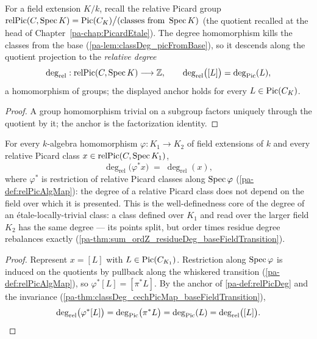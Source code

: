 \begin{definition}
  \label{pa-def:relPicDeg}
  \leanok

  For a field extension \(K/k\), recall the relative Picard group
  \(\mathrm{relPic}(C, \operatorname{Spec} K) = \operatorname{Pic}(C_K) \big/ (\text{classes from } \operatorname{Spec} K)\)
  (the quotient recalled at the head of Chapter~\ref{pa-chap:PicardEtale}). The degree
  homomorphism kills the classes from the base
  (\ref{pa-lem:classDeg_picFromBase}), so it descends along the quotient projection to
  the \emph{relative degree}
  \[
    \deg_{\mathrm{rel}} : \mathrm{relPic}(C, \operatorname{Spec} K) \longrightarrow \mathbb{Z},
    \qquad \deg_{\mathrm{rel}}\bigl([L]\bigr) = \deg_{\operatorname{Pic}}(L),
  \]
  a homomorphism of groups; the displayed anchor holds for every
  \(L \in \operatorname{Pic}(C_K)\).
\end{definition}
\begin{proof}
  \leanok
  A group homomorphism trivial on a subgroup factors uniquely through the quotient by
  it; the anchor is the factorization identity.
\end{proof}

\begin{theorem}
  \label{pa-thm:relPicDeg_relPicAlgMap}
  \leanok

  For every \(k\)-algebra homomorphism \(\varphi : K_1 \to K_2\) of field extensions
  of \(k\) and every relative Picard class \(x \in \mathrm{relPic}(C, \operatorname{Spec} K_1)\),
  \[
    \deg_{\mathrm{rel}}\bigl(\varphi^{*}x\bigr) \;=\; \deg_{\mathrm{rel}}(x),
  \]
  where \(\varphi^{*}\) is restriction of relative Picard classes along
  \(\operatorname{Spec}\varphi\) (\ref{pa-def:relPicAlgMap}): the degree of a relative Picard class
  does not depend on the field over which it is presented. This is the
  well-definedness core of the degree of an \'etale-locally-trivial class: a class
  defined over \(K_1\) and read over the larger field \(K_2\) has the same degree ---
  its points split, but order times residue degree rebalances exactly
  (\ref{pa-thm:sum_ordZ_residueDeg_baseFieldTransition}).
\end{theorem}
\begin{proof}
  \leanok
  Represent \(x = [L]\) with \(L \in \operatorname{Pic}(C_{K_1})\). Restriction along
  \(\operatorname{Spec}\varphi\) is induced on the quotients by pullback along the whiskered
  transition (\ref{pa-def:relPicAlgMap}), so \(\varphi^{*}[L] = [\pi^{*}L]\). By the
  anchor of \ref{pa-def:relPicDeg} and the invariance
  (\ref{pa-thm:classDeg_cechPicMap_baseFieldTransition}),
  \[
    \deg_{\mathrm{rel}}\bigl(\varphi^{*}[L]\bigr)
      = \deg_{\operatorname{Pic}}\bigl(\pi^{*}L\bigr)
      = \deg_{\operatorname{Pic}}(L)
      = \deg_{\mathrm{rel}}\bigl([L]\bigr). \qedhere
  \]
\end{proof}

